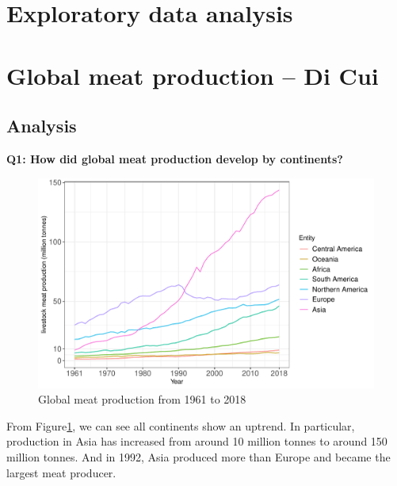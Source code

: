 \documentclass[11pt,a4paper,]{article}
\begin{document}
\clearpage

\hypertarget{exploratory-data-analysis}{%
\section{Exploratory data analysis}\label{exploratory-data-analysis}}

\section*{Global meat production -- Di Cui}

\subsection*{Analysis}

\textbf{Q1: How did global meat production develop by continents?}

\begin{figure}
\centering
\includegraphics{report_files/figure-latex/continent-figure-1.pdf}
\caption{\label{fig:continent-figure}Global meat production from 1961 to 2018}
\end{figure}

From Figure\ref{fig:continent-figure}, we can see all continents show an uptrend. In particular, production in Asia has increased from around 10 million tonnes to around 150 million tonnes. And in 1992, Asia produced more than Europe and became the largest meat producer.

\clearpage
\end{document}
